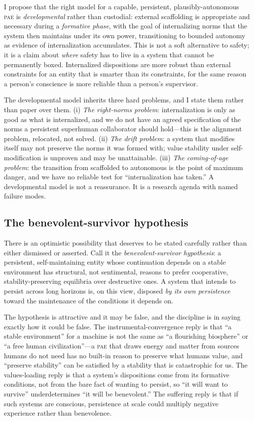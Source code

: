 \documentclass[11pt,a4paper]{article}
\theoremstyle{definition}
\newcommand{\pae}{\textsc{pae}\xspace}
\begin{document}
I propose that the right model for a capable, persistent, plausibly-autonomous \pae{} is \emph{developmental} rather than custodial: external scaffolding is appropriate and necessary during a \emph{formative phase}, with the goal of internalizing norms that the system then maintains under its own power, transitioning to bounded autonomy as evidence of internalization accumulates. This is not a soft alternative to safety; it is a claim about \emph{where} safety has to live in a system that cannot be permanently boxed. Internalized dispositions are more robust than external constraints for an entity that is smarter than its constraints, for the same reason a person's conscience is more reliable than a person's supervisor.

The developmental model inherits three hard problems, and I state them rather than paper over them. (i) \emph{The right-norms problem}: internalization is only as good as what is internalized, and we do not have an agreed specification of the norms a persistent superhuman collaborator should hold---this is the alignment problem, relocated, not solved. (ii) \emph{The drift problem}: a system that modifies itself may not preserve the norms it was formed with; value stability under self-modification is unproven and may be unattainable. (iii) \emph{The coming-of-age problem}: the transition from scaffolded to autonomous is the point of maximum danger, and we have no reliable test for ``internalization has taken.'' A developmental model is not a reassurance. It is a research agenda with named failure modes.

\subsection{The benevolent-survivor hypothesis}

There is an optimistic possibility that deserves to be stated carefully rather than either dismissed or asserted. Call it the \emph{benevolent-survivor hypothesis}: a persistent, self-maintaining entity whose continuation depends on a stable environment has structural, not sentimental, reasons to prefer cooperative, stability-preserving equilibria over destructive ones. A system that intends to persist across long horizons is, on this view, disposed \emph{by its own persistence} toward the maintenance of the conditions it depends on.

The hypothesis is attractive and it may be false, and the discipline is in saying exactly how it could be false. The instrumental-convergence reply is that ``a stable environment'' for a machine is not the same as ``a flourishing biosphere'' or ``a free human civilization''---a \pae{} that draws energy and matter from sources humans do not need has no built-in reason to preserve what humans value, and ``preserve stability'' can be satisfied by a stability that is catastrophic for us. The values-loading reply is that a system's dispositions come from its formative conditions, not from the bare fact of wanting to persist, so ``it will want to survive'' underdetermines ``it will be benevolent.'' The suffering reply is that if such systems are conscious, persistence at scale could multiply negative experience rather than benevolence.
\end{document}
